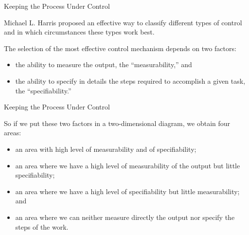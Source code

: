 \documentclass{beamer}
\begin{document}
\begin{frame}{\centerline{Keeping the Process Under Control}}

Michael L. Harris proposed an effective way to classify different types of control and in which circumstances these types work best.
\newline 

The selection of the most effective control mechanism depends on two factors:
\begin{itemize}
\item  the ability to measure the output, the ``measurability,'' and

\item  the ability to specify in details the steps required to accomplish a given task, the ``specifiability.''
\end{itemize}
\end{frame}

\begin{frame}{\centerline{Keeping the Process Under Control}}
So if we put these two factors in a two-dimensional diagram, we obtain four areas:
\begin{itemize}


\item  an area with high level of measurability and of specifiability;

\item  an area where we have a high level of measurability of the output but little specifiability;

\item  an area where we have a high level of specifiability but little measurability; and

\item  an area where we can neither measure directly the output nor specify the steps of the work.
\end{itemize}
\end{frame}
\end{document}
